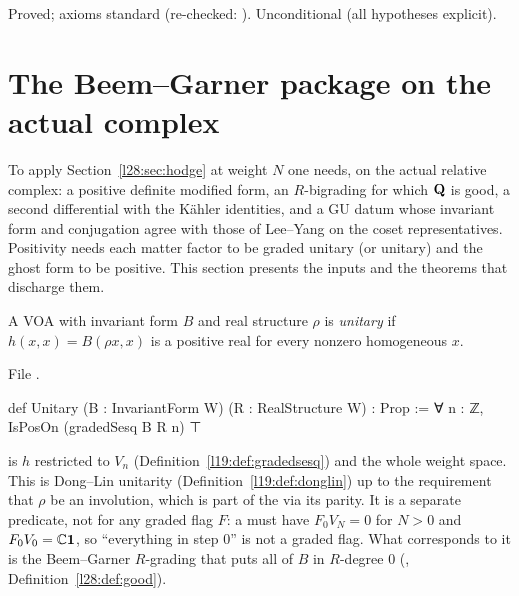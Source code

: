 \begin{status}
Proved; axioms standard (re-checked: ). Unconditional (all hypotheses explicit).
\end{status}

\section{The Beem--Garner package on the actual complex}\label{l28:sec:package}

To apply Section~\ref{l28:sec:hodge} at weight $N$ one needs, on the actual relative complex: a positive definite modified form, an
$R$-bigrading for which $\mathbf Q$ is good, a second differential with the Kähler identities, and a GU datum whose invariant form and
conjugation agree with those of Lee--Yang on the coset representatives. Positivity needs each matter factor to be graded unitary (or
unitary) and the ghost form to be positive. This section presents the inputs and the theorems that discharge them.

\begin{definition}\label{l28:def:unitary}
A VOA with invariant form $B$ and real structure $\rho$ is \emph{unitary} if $h(x,x)=B(\rho x,x)$ is a positive real for every nonzero
homogeneous $x$.
\end{definition}

\noindent File .
\begin{leancode}
def Unitary (B : InvariantForm W) (R : RealStructure W) : Prop :=
  ∀ n : ℤ, IsPosOn (gradedSesq B R n) ⊤
\end{leancode}

\begin{dictionary}
 is $h$ restricted to $V_n$ (Definition~\ref{l19:def:gradedsesq}) and  the whole weight space. This is
Dong--Lin unitarity (Definition~\ref{l19:def:donglin}) up to the requirement that $\rho$ be an involution, which is part of the
 via its parity. It is a separate predicate, not  for any graded flag $F$: a
 must have $F_0V_N=0$ for $N>0$ and $F_0V_0={\mathbb{C}}\mathbf 1$, so ``everything in step $0$'' is not a graded flag. What
corresponds to it is the Beem--Garner $R$-grading that puts all of $B$ in $R$-degree $0$ (, Definition~\ref{l28:def:good}).
\end{dictionary}

